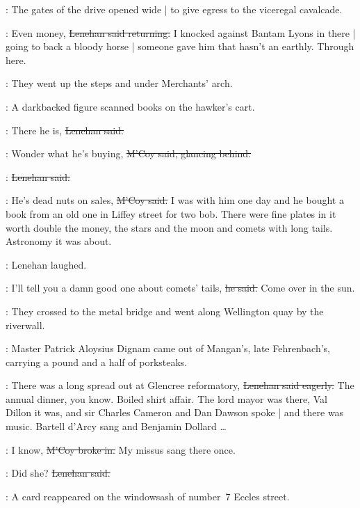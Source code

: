 :
The gates of the drive opened wide |
to give egress to the viceregal cavalcade.

\lenehan:
Even money,
\sout{Lenehan said returning.}
I knocked against Bantam Lyons in there |
going to back a bloody horse |
someone gave him that hasn't an earthly.
Through here.

:
They went up the steps and under Merchants' arch.%

\begin{interject}
    :
    A darkbacked figure scanned books on the hawker's cart.
\end{interject}

\lenehan:
There he is,
\sout{Lenehan said.}

\mcoy:
Wonder what he's buying,
\sout{M'Coy said,
glancing behind.}

\lenehan:
\sout{Lenehan said.}

\mcoy:
He's dead nuts on sales,
\sout{M'Coy said.}
I was with him one day
and he bought a book 
from an old one in Liffey street for two bob.
There were fine plates in it worth double the money,
the stars and the moon and comets with long tails.
Astronomy it was about.

:
Lenehan laughed.

\lenehan:
I'll tell you a damn good one about comets' tails,
\sout{he said.}%
Come over in the sun.

:
They crossed to the metal bridge
and went along Wellington quay by the riverwall.

\begin{interject}
    :
    Master Patrick Aloysius Dignam came out of Mangan's,
    late Fehrenbach's,
    carrying a pound and a half of porksteaks.
\end{interject}

\lenehan:
There was a long spread out at Glencree reformatory,
\sout{Lenehan said eagerly.}
The annual dinner, you know.
Boiled shirt affair.
The lord mayor was there,
Val Dillon it was,
and sir Charles Cameron and Dan Dawson spoke |
and there was music.
Bartell d'Arcy sang and Benjamin Dollard \ldots

\mcoy:
I know,
\sout{M'Coy broke in.}%
My missus sang there once.

\lenehan:
Did she?
\sout{Lenehan said.}

\begin{interject}
    :
    A card  reappeared
    on the windowsash of number~7 Eccles street.
\end{interject}

